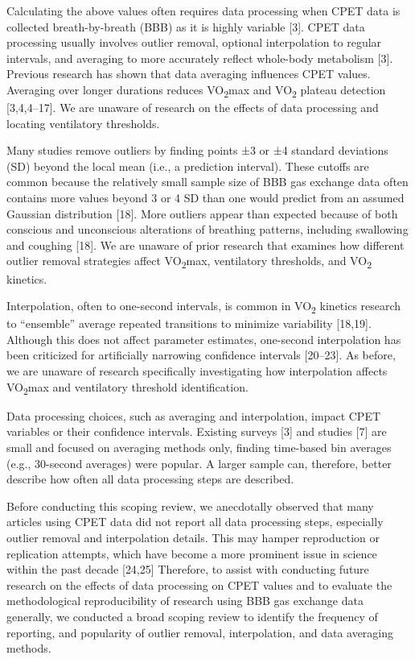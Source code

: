 \documentclass[
  letterpaper,
  DIV=11,
  numbers=noendperiod]{scrartcl}
\begin{document}
Calculating the above values often requires data processing when CPET
data is collected breath-by-breath (BBB) as it is highly variable
{[}3{]}. CPET data processing usually involves outlier removal, optional
interpolation to regular intervals, and averaging to more accurately
reflect whole-body metabolism {[}3{]}. Previous research has shown that
data averaging influences CPET values. Averaging over longer durations
reduces VO\textsubscript{2}max and VO\textsubscript{2} plateau detection
{[}3,4,4--17{]}. We are unaware of research on the effects of data
processing and locating ventilatory thresholds.

Many studies remove outliers by finding points ±3 or ±4 standard
deviations (SD) beyond the local mean (i.e., a prediction interval).
These cutoffs are common because the relatively small sample size of BBB
gas exchange data often contains more values beyond 3 or 4 SD than one
would predict from an assumed Gaussian distribution {[}18{]}. More
outliers appear than expected because of both conscious and unconscious
alterations of breathing patterns, including swallowing and coughing
{[}18{]}. We are unaware of prior research that examines how different
outlier removal strategies affect VO\textsubscript{2}max, ventilatory
thresholds, and VO\textsubscript{2} kinetics.

Interpolation, often to one-second intervals, is common in
VO\textsubscript{2} kinetics research to ``ensemble'' average repeated
transitions to minimize variability {[}18,19{]}. Although this does not
affect parameter estimates, one-second interpolation has been criticized
for artificially narrowing confidence intervals {[}20--23{]}. As before,
we are unaware of research specifically investigating how interpolation
affects VO\textsubscript{2}max and ventilatory threshold identification.

Data processing choices, such as averaging and interpolation, impact
CPET variables or their confidence intervals. Existing surveys {[}3{]}
and studies {[}7{]} are small and focused on averaging methods only,
finding time-based bin averages (e.g., 30-second averages) were popular.
A larger sample can, therefore, better describe how often all data
processing steps are described.

Before conducting this scoping review, we anecdotally observed that many
articles using CPET data did not report all data processing steps,
especially outlier removal and interpolation details. This may hamper
reproduction or replication attempts, which have become a more prominent
issue in science within the past decade {[}24,25{]} Therefore, to assist
with conducting future research on the effects of data processing on
CPET values and to evaluate the methodological reproducibility of
research using BBB gas exchange data generally, we conducted a broad
scoping review to identify the frequency of reporting, and popularity of
outlier removal, interpolation, and data averaging methods.
\end{document}
